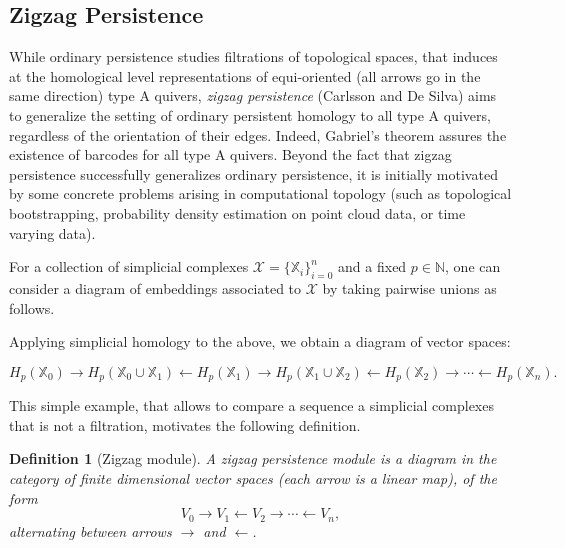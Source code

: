 \documentclass[11pt]{article}
\newtheorem{definition}[theorem]{Definition}
\theoremstyle{remark}
\newcommand{\N}{\mathbb{N}}
\newcommand{\X}{\mathbb{X}}
\begin{document}
\subsection{Zigzag Persistence}
\label{zigzag_theory}

While ordinary persistence studies filtrations of topological spaces, that induces at the homological level  representations of equi-oriented (all arrows go in the same direction) type A quivers, \textit{zigzag persistence} \cite{carlsson2008zigzag} (Carlsson and De Silva) aims to generalize the setting of ordinary persistent homology to all type A quivers, regardless of the orientation of their edges. Indeed, Gabriel's theorem assures the existence of barcodes for all type A quivers. Beyond the fact that zigzag persistence successfully generalizes ordinary persistence, it is initially motivated by some concrete problems arising in computational topology (such as topological bootstrapping, probability density estimation on point cloud data, or time varying data). 

For a collection of simplicial complexes $\mathcal{X}=\{\X_i\}_{i=0}^n$ and a fixed $p\in\N$, one can consider a diagram of embeddings associated to $\mathcal{X}$ by taking pairwise unions as follows.
\begin{center}
\end{center}

Applying simplicial homology to the above, we obtain a diagram of vector spaces:

\[
H_p(\X_0) \longrightarrow H_p(\X_0 \cup \X_1) \longleftarrow H_p(\X_1)  \longrightarrow  H_p(\X_1 \cup \X_2) \longleftarrow H_p(\X_2) \longrightarrow \cdots \longleftarrow H_p(\X_n).
\]

This simple example, that allows to compare a sequence a simplicial complexes that is not a filtration, motivates the following definition.


\begin{definition}[Zigzag module]
A \emph{zigzag persistence module} is a diagram in the category of finite dimensional vector spaces (each arrow is a linear map), of the form 
\[
V_0\longrightarrow V_1\longleftarrow V_2\longrightarrow \cdots\longleftarrow V_n,
\]
alternating between arrows $\longrightarrow$ and $\longleftarrow$.

\end{definition} 
\end{document}
